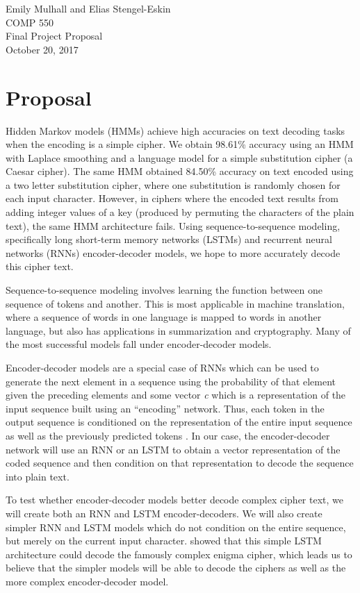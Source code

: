 \documentclass{article}
\begin{document}
\noindent Emily Mulhall and Elias Stengel-Eskin\\
COMP 550\\
Final Project Proposal\\
October 20, 2017\\

\section{Proposal}
Hidden Markov models (HMMs) achieve high accuracies on text decoding tasks when the encoding is a simple cipher. We obtain 98.61\% accuracy using an HMM with Laplace smoothing and a language model for a simple substitution cipher (a Caesar cipher). The same HMM obtained 84.50\% accuracy on text encoded using a two letter substitution cipher, where one substitution is randomly chosen for each input character. However, in ciphers where the encoded text results from adding integer values of a key (produced by permuting the characters of the plain text), the same HMM architecture fails. Using sequence-to-sequence modeling, specifically long short-term memory networks (LSTMs) and recurrent neural networks (RNNs) encoder-decoder models, we hope to more accurately decode this cipher text.

Sequence-to-sequence modeling involves learning the function between one sequence of tokens and another. This is most applicable in machine translation, where a sequence of words in one language is mapped to words in another language, but also has applications in summarization and cryptography. Many of the most successful models fall under encoder-decoder models. 

Encoder-decoder models are a special case of RNNs which can be used to generate the next element in a sequence using the probability of that element given the preceding elements and some vector \textit{c} which is a representation of the input sequence built using an ``encoding'' network. Thus, each token in the output sequence is conditioned on the representation of the entire input sequence as well as the previously predicted tokens \citep{goldberg.y:2017}.  In our case, the  encoder-decoder network will use an RNN or an LSTM to obtain a vector representation of the coded sequence and then condition on that representation to decode the sequence into plain text. 

To test whether encoder-decoder models better decode complex cipher text, we will create both an RNN and LSTM encoder-decoders. We will also create simpler RNN and LSTM models which do not condition on the entire sequence, but merely on the current input character. \citet{greydanus.s:2017} showed that this simple LSTM architecture could decode the famously complex enigma cipher, which leads us to believe that the simpler models will be able to decode the ciphers as well as the more complex encoder-decoder model. 
\end{document}
